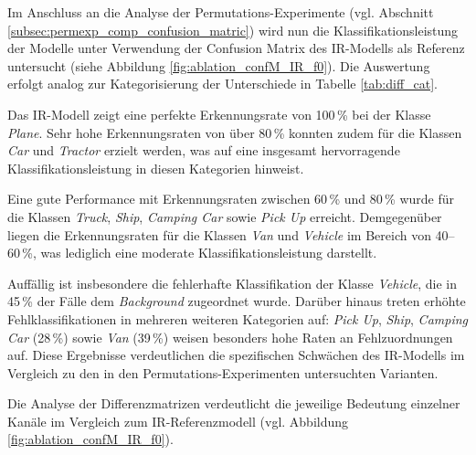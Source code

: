 Im Anschluss an die Analyse der Permutations-Experimente (vgl. Abschnitt \ref{subsec:permexp_comp_confusion_matric}) wird nun die Klassifikationsleistung der Modelle unter Verwendung der Confusion Matrix des IR-Modells als Referenz untersucht (siehe Abbildung \ref{fig:ablation_confM_IR_f0}). Die Auswertung erfolgt analog zur Kategorisierung der Unterschiede in Tabelle \ref{tab:diff_cat}.  

Das IR-Modell zeigt eine perfekte Erkennungsrate von 100\,\% bei der Klasse \textit{Plane}. Sehr hohe Erkennungsraten von über 80\,\% konnten zudem für die Klassen \textit{Car} und \textit{Tractor} erzielt werden, was auf eine insgesamt hervorragende Klassifikationsleistung in diesen Kategorien hinweist.  

Eine gute Performance mit Erkennungsraten zwischen 60\,\% und 80\,\% wurde für die Klassen \textit{Truck}, \textit{Ship}, \textit{Camping Car} sowie \textit{Pick Up} erreicht. Demgegenüber liegen die Erkennungsraten für die Klassen \textit{Van} und \textit{Vehicle} im Bereich von 40--60\,\%, was lediglich eine moderate Klassifikationsleistung darstellt.  

Auffällig ist insbesondere die fehlerhafte Klassifikation der Klasse \textit{Vehicle}, die in 45\,\% der Fälle dem \textit{Background} zugeordnet wurde. Darüber hinaus treten erhöhte Fehlklassifikationen in mehreren weiteren Kategorien auf: \textit{Pick Up}, \textit{Ship}, \textit{Camping Car} (28\,\%) sowie \textit{Van} (39\,\%) weisen besonders hohe Raten an Fehlzuordnungen auf. Diese Ergebnisse verdeutlichen die spezifischen Schwächen des IR-Modells im Vergleich zu den in den Permutations-Experimenten untersuchten Varianten.  


Die Analyse der Differenzmatrizen verdeutlicht die jeweilige Bedeutung einzelner Kanäle im Vergleich zum IR-Referenzmodell (vgl. Abbildung \ref{fig:ablation_confM_IR_f0}).  


